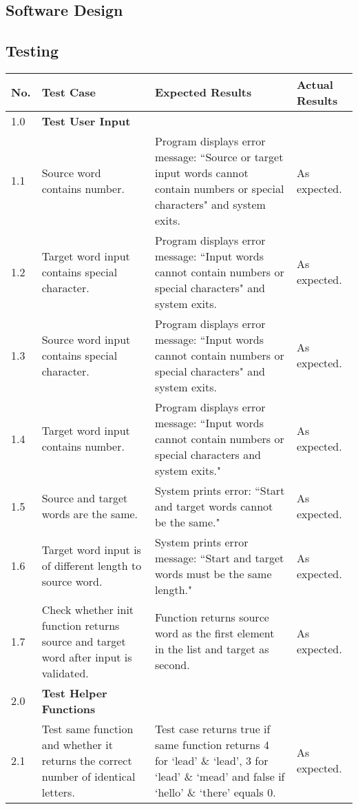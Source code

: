 \documentclass[12pt, a4]{report}
\begin{document}
	\pagebreak
	
	\subsection{Software Design}
	\subsubsection{}
	
	
	\pagebreak
	
	
	\subsection{Testing}
	
	
	\begin{tabular}{ |p{0.5cm}|p{5cm}|p{5cm}|p{5cm}| }
		\hline
		No. & Test Case & Expected Results & Actual Results \\
		\hline
		1.0 & \textbf{Test User Input} &  & \\
		1.1 & Source word contains number. & Program displays error message: ``Source or target input words cannot contain numbers or special characters" and system exits. & As expected.\\
		1.2 & Target word input contains special character. & Program displays error message: ``Input words cannot contain numbers or special characters" and system exits. & As expected. \\
		1.3 & Source word input contains special character. & Program displays error message: ``Input words cannot contain numbers or special characters" and system exits. & As expected. \\
		1.4 & Target word input contains number. & Program displays error message: ``Input words cannot contain numbers or special characters and system exits." & As expected. \\
		1.5 & Source and target words are the same. & System prints error: ``Start and target words cannot be the same." & As expected. \\
		1.6 & Target word input is of different length to source word. & System prints error message: ``Start and target words must be the same length." & As expected. \\
		1.7 & Check whether init function returns source and target word after input is validated. & Function returns source word as the first element in the list and target as second. & As expected.\\
		2.0 & \textbf{Test Helper Functions} &  &  \\
		2.1 & Test same function and whether it returns the correct number of identical letters. & Test case returns true if same function returns 4 for `lead' \& `lead', 3 for `lead' \& `mead' and false if `hello' \& `there' equals 0. & As expected. \\
		\hline
	\end{tabular}
	
\end{document}
